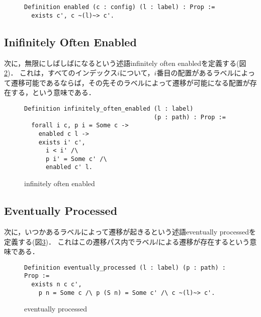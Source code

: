 \begin{figure}[tp]
\begin{lstlisting}
Definition enabled (c : config) (l : label) : Prop :=
  exists c', c ~(l)~> c'.
\end{lstlisting}
  \caption{\enabled}\label{code:formalization:enabled}
\end{figure}

\subsection{Inifinitely Often Enabled}
次に，無限にしばしば\enabled になるという述語infinitely often enabledを定義する(図\ref{code:proof:infinitely-often-enabled})．
これは，すべてのインデックス$i$について，$i$番目の配置があるラベルによって遷移可能であるならば，その先そのラベルによって遷移が可能になる配置が存在する，という意味である．

\begin{figure}
\begin{lstlisting}
Definition infinitely_often_enabled (l : label)
                                    (p : path) : Prop :=
  forall i c, p i = Some c ->
    enabled c l ->
    exists i' c',
      i < i' /\
      p i' = Some c' /\
      enabled c' l.
\end{lstlisting}
\caption{infinitely often enabled}\label{code:proof:infinitely-often-enabled}
\end{figure}

\subsection{Eventually Processed}
次に，いつかあるラベルによって遷移が起きるという述語eventually processedを定義する(図\ref{code:proof:eventually-processed})．
これはこの遷移パス内でラベル$l$による遷移が存在するという意味である．

\begin{figure}
\begin{lstlisting}
Definition eventually_processed (l : label) (p : path) : Prop :=
  exists n c c',
    p n = Some c /\ p (S n) = Some c' /\ c ~(l)~> c'.
\end{lstlisting}
\caption{eventually processed}\label{code:proof:eventually-processed}
\end{figure}


